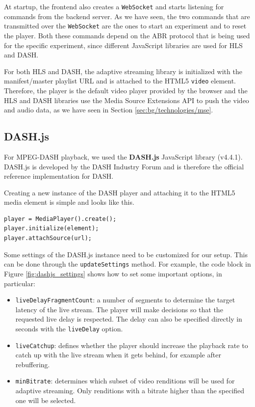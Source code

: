 At startup, the frontend also creates a \texttt{WebSocket} and starts listening for commands from the backend server. As we have seen, the two commands that are transmitted over the \texttt{WebSocket} are the ones to start an experiment and to reset the player. Both these commands depend on the ABR protocol that is being used for the specific experiment, since different JavaScript libraries are used for HLS and DASH.

For both HLS and DASH, the adaptive streaming library is initialized with the manifest/master playlist URL and is attached to the HTML5 \texttt{video} element. Therefore, the player is the default video player provided by the browser and the HLS and DASH libraries use the Media Source Extensions API to push the video and audio data, as we have seen in Section \ref{sec:bg/technologies/mse}.

\subsection{DASH.js}
\label{sec:testbed/frontend/dashjs}

For MPEG-DASH playback, we used the \textbf{DASH.js} JavaScript library (v4.4.1). DASH.js is developed by the DASH Industry Forum and is therefore the official reference implementation for DASH.

Creating a new instance of the DASH player and attaching it to the HTML5 media element is simple and looks like this.

\begin{verbatim}
player = MediaPlayer().create();
player.initialize(element);
player.attachSource(url);
\end{verbatim}

Some settings of the DASH.js instance need to be customized for our setup. This can be done through the \texttt{updateSettings} method. For example, the code block in Figure \ref{fig:dashjs_settings} shows how to set some important options, in particular:

\begin{itemize}
    \item \texttt{liveDelayFragmentCount}: a number of segments to determine the target latency of the live stream. The player will make decisions so that the requested live delay is respected. The delay can also be specified directly in seconds with the \texttt{liveDelay} option.
    \item \texttt{liveCatchup}: defines whether the player should increase the playback rate to catch up with the live stream when it gets behind, for example after rebuffering.
    \item \texttt{minBitrate}: determines which subset of video renditions will be used for adaptive streaming. Only renditions with a bitrate higher than the specified one will be selected.
\end{itemize}

